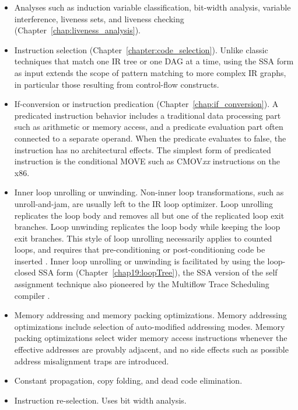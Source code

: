 \begin{itemize}

\item Analyses such as induction variable classification, bit-width analysis,
variable interference, liveness sets, and liveness checking
(Chapter~\ref{chap:liveness_analysis}).

\item Instruction selection (Chapter~\ref{chapter:code_selection}). Unlike
classic techniques that match one IR tree or one DAG at a time, using the SSA
form as input extends the scope of pattern matching to more complex IR graphs,
in particular those resulting from control-flow constructs.

\item If-conversion or instruction predication
(Chapter~\ref{chap:if_conversion}). A predicated instruction behavior includes a
traditional data processing part such as arithmetic or memory access, and a
predicate evaluation part often connected to a separate operand. When the
predicate evaluates to false, the instruction has no architectural effects. The
simplest form of predicated instruction is the conditional MOVE such as
CMOV\emph{xx} instructions on the x86. 

\item Inner loop unrolling or unwinding. Non-inner loop transformations, such as
unroll-and-jam, are usually left to the IR loop optimizer. Loop unrolling
replicates the loop body and removes all but one of the replicated loop exit
branches. Loop unwinding replicates the loop body while keeping the loop exit
branches. This style of loop unrolling necessarily applies to counted loops, and
requires that pre-conditioning or post-conditioning code be inserted
\cite{Lownet:1992:JS}. Inner loop unrolling or unwinding is facilitated by using
the loop-closed SSA form (Chapter~\ref{chap19:loopTree}), the SSA version of the
self assignment technique also pioneered by the Multiflow Trace Scheduling
compiler \cite{Lownet:1992:JS}.

\item Memory addressing and memory packing optimizations. Memory addressing
optimizations include selection of auto-modified addressing modes. Memory
packing optimizations select wider memory access instructions whenever the
effective addresses are provably adjacent, and no side effects such as
possible address misalignment traps are introduced.

\item Constant propagation, copy folding, and dead code elimination.

\item Instruction re-selection. Uses bit width analysis.

\end{itemize} \medskip

